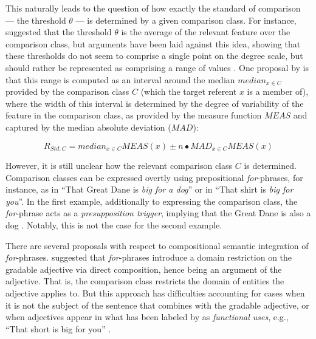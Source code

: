 This naturally leads to the question of how exactly the standard of comparison --- the threshold $\theta$ --- is determined by a given comparison class. For instance, \textcite{Cresswell1976} suggested that the threshold $\theta$ is the average of the relevant feature over the comparison class, but arguments have been laid against this idea, showing that these thresholds do not seem to comprise a single point on the degree scale, but should rather be represented as comprising a range of values \parencite{Kennedy2007, vonStechow1984}. 
One proposal by \textcite[p.194]{Solt2009} is that this range is computed as an interval around the median $median_{x\in C}$ provided by the comparison class $C$ (which the target referent $x$ is a member of), where the width of this interval is determined by the degree of variability of the feature in the comparison class, as provided by the measure function $MEAS$ and captured by the median absolute deviation ($MAD$):

$$R_{Std:C} = median_{x \in C} MEAS(x) \pm n \bullet MAD_{x \in C} MEAS(x)$$

However, it is still unclear how the relevant comparison class $C$ is determined. Comparison classes can be expressed overtly using prepositional \textit{for}-phrases, for instance, as in “That Great Dane is \emph{big for a dog}” or in “That shirt is \emph{big for you}”. In the first example, additionally to expressing the comparison class, the \textit{for}-phrase acts as a \textit{presupposition trigger}, implying that the Great Dane is also a dog \parencite[cf.][]{Bale2011, Solt2009}. Notably, this is not the case for the second example. 

There are several proposals with respect to compositional semantic integration of \textit{for}-phrases. \textcite{Kennedy2007} suggested that \textit{for}-phrases introduce a domain restriction on the gradable adjective via direct composition, hence being an argument of the adjective. That is, the comparison class restricts the domain of entities the adjective applies to. But this approach has difficulties accounting for cases when it is not the subject of the sentence that combines with the gradable adjective, or when adjectives appear in what has been labeled by \textcite{ebeling1994children} as \textit{functional uses}, e.g., “That short is big for you” \parencite{Solt2009}. 

